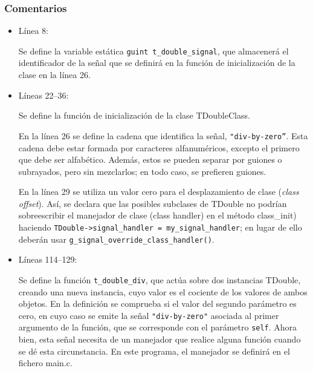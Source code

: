 \subsubsection{Comentarios}
\begin{itemize}
\item Línea 8:\par
  Se define la variable estática \texttt{guint t\_double\_signal}, que almacenerá el
  identificador de la señal que se definirá en la función de inicialización de la clase
  en la línea 26.
\item Líneas 22--36:\par
  Se define la función de inicialización de la clase \textsf{TDoubleClass}.
  
  En la línea 26 se define la cadena que identifica la señal, \texttt{"div-by-zero''}.
  Esta cadena debe estar formada por caracteres alfanuméricos, excepto el primero que
  debe ser alfabético. Además, estos se pueden separar por guiones o subrayados, pero
  sin mezclarlos; en todo caso, se prefieren guiones.
  
  En la línea 29 se utiliza un valor cero para el desplazamiento de clase (\emph{class
    offset}).
  Así, se declara que  las posibles subclases de \textsf{TDouble} no podrían
  sobreescribir el manejador de clase (\textsf{class handler}) en el método
  \textsf{class\_init}) haciendo
  \texttt{TDouble->signal\_handler = my\_signal\_handler}; en lugar de ello deberán usar
  \texttt{g\_signal\_override\_class\_handler()}.
\item Líneas 114--129:\par
  Se define la función \texttt{t\_double\_div}, que actúa sobre dos instancias \textsf{TDouble},
  creando una nueva instancia, cuyo valor es el cociente de los valores de ambos objetos.
  En la definición se comprueba si el valor del segundo parámetro es cero, en cuyo caso
  se emite la señal \texttt{"div-by-zero"} asociada al primer argumento de la función,
  que se corresponde con el parámetro \texttt{self}. Ahora bien, esta señal necesita de
  un manejador que realice alguna función cuando se dé esta circunstancia. En este
  programa, el manejador se definirá en el fichero \textsf{main.c}.
\end{itemize}

